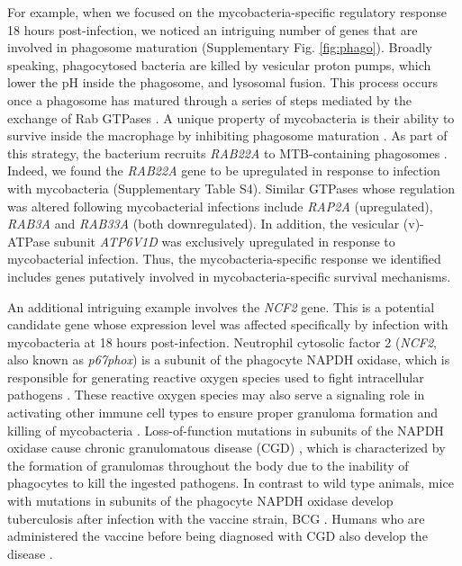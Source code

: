 For example, when we focused on the mycobacteria-specific regulatory
response 18 hours post-infection, we noticed an intriguing number of
genes that are involved in phagosome maturation (Supplementary Fig. \ref{fig:phago}). Broadly speaking, phagocytosed bacteria are killed by vesicular
proton pumps, which lower the pH inside the phagosome, and lysosomal
fusion. This process occurs once a phagosome has matured through a
series of steps mediated by the exchange of Rab GTPases \citep{Vergne2004,
Mortellaro2009}. A unique property of mycobacteria is their ability
to survive inside the macrophage by inhibiting phagosome maturation
\citep{Hestvik2005}. As part of this strategy, the bacterium recruits
\emph{RAB22A} to MTB-containing phagosomes \citep{Roberts2006}. Indeed,
we found the \emph{RAB22A} gene to be upregulated in response to
infection with mycobacteria (Supplementary Table S4). Similar GTPases
whose regulation was altered following mycobacterial infections include
\emph{RAP2A} (upregulated), \emph{RAB3A} and \emph{RAB33A} (both
downregulated). In addition, the vesicular (v)-ATPase subunit
\emph{ATP6V1D} was exclusively upregulated in response to mycobacterial
infection. Thus, the mycobacteria-specific response we identified
includes genes putatively involved in mycobacteria-specific survival
mechanisms.

An additional intriguing example involves the \emph{NCF2} gene. This is
a potential candidate gene whose expression level was affected
specifically by infection with mycobacteria at 18 hours post-infection.
Neutrophil cytosolic factor 2 (\emph{NCF2}, also known as
\emph{p67phox}) is a subunit of the phagocyte NAPDH oxidase, which is
responsible for generating reactive oxygen species used to fight
intracellular pathogens \citep{Ehrt2001, Myers2003, Babior2004,
Bustamante2011, Kim2011c, Deffert2014}. These reactive oxygen
species may also serve a signaling role in activating other immune cell
types to ensure proper granuloma formation and killing of mycobacteria
\citep{Deffert2014a}. Loss-of-function mutations in subunits of the NAPDH
oxidase cause chronic granulomatous disease (CGD) \citep{Deffert2014},
which is characterized by the formation of granulomas throughout the
body due to the inability of phagocytes to kill the ingested pathogens.
In contrast to wild type animals, mice with mutations in subunits of the
phagocyte NAPDH oxidase develop tuberculosis after infection with the
vaccine strain, BCG \citep{Deffert2014a}. Humans who are administered the
vaccine before being diagnosed with CGD also develop the disease
\citep{Deffert2014}.

